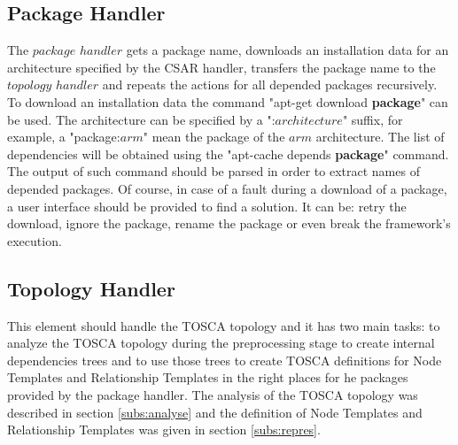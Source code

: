 \subsection{Package Handler} \label{subs:archph}
The $package$ $handler$ gets a package name, downloads an installation data for an architecture specified by the CSAR handler, transfers the package name to the $topology$ $handler$ and repeats the actions for all depended packages recursively. 
To download an installation data the command "apt-get download \textbf{package}" can be used. 
The architecture can be specified by a ":$architecture$" suffix, for example, a "package:$arm$" mean the package of the $arm$ architecture.
The list of dependencies will be obtained using the "apt-cache depends \textbf{package}" command. 
The output of such command should be parsed in order to extract names of depended packages.
Of course, in case of a fault during a download of a package, a user interface should be provided to find a solution.
It can be: retry the download, ignore the package, rename the package or even break the framework's execution.

\subsection{Topology Handler} \label{subs:archtop}
This element should handle the TOSCA topology and it has two main tasks: to analyze the TOSCA topology during the preprocessing stage to create internal dependencies trees and to use those trees to create TOSCA definitions for Node Templates and Relationship Templates in the right places for he packages provided by the package handler.
The analysis of the TOSCA topology was described in section \ref{subs:analyse} and the definition of Node Templates and Relationship Templates was given in section \ref{subs:repres}.
